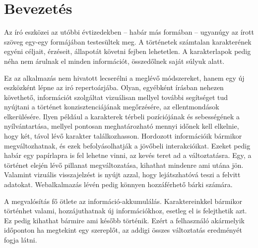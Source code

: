 \chapter{Bevezetés}
\label{ch:intro}

Az író eszközei az utóbbi évtizedekben -- habár más formában -- ugyanúgy az írott szöveg egy-egy formájában testesültek meg. A történetek számtalan karakterének egyéni céljait, érzéseit, állapotát követni fejben lehetetlen. A karakterlapok pedig néha nem árulnak el minden információt, összedőlnek saját súlyuk alatt.

Ez az alkalmazás nem hivatott lecserélni a meglévő módszereket, hanem egy új eszközként lépne az iró repertoárjába. Olyan, egyébként írásban nehezen követhető, információt szolgáltat vizuálisan mellyel további segítséget tud nyújtani a történet konzisztenciájának megőrzésére, az ellentmondások elkerülésére. Ilyen például a karakterek térbeli pozíciójának és sebességének a nyílvántartása, mellyel pontosan meghatározható mennyi időnek kell elkelnie, hogy két, távol lévő karakter találkozhasson. Hordozott információik bármikor megváltozhatnak, és ezek befolyásolhatják a jövőbeli interakcióikat. Ezeket pedig habár egy papírlapra is fel lehetne vinni, az kevés teret ad a változtatásra. Egy, a történet elején lévő pillanat megváltozatása, kihathat mindenre ami utána jön. Valamint vizuális visszajelzést is nyújt azzal, hogy lejátszhatóvá teszi a felvitt adatokat. Webalkalmazás lévén pedig könnyen hozzáférhető bárki számára.


A megvalósítás fő ötlete az információ-akkumulálás. Karaktereinkkel bármikor történhet valami, hozzájuthatnak új információkhoz, esetleg el is felejthetik azt. Ez pedig kihathat bármire ami később történik. Ezért a felhasználó akármelyik időponton ha megtekint egy szereplőt, az addigi összes változtatás eredményét fogja látni.
